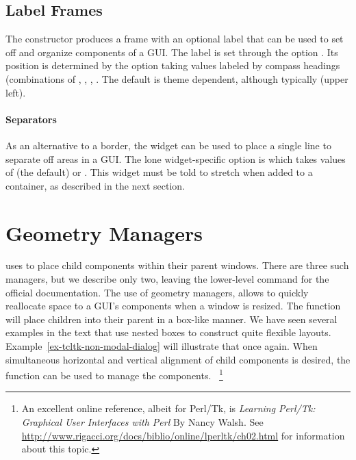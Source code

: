\subsection{Label Frames}
\label{sec:tcltk:label-frames}

The  constructor produces a frame with an
optional label that can be used to set off and organize components of
a GUI. The label is set through the option
. Its position is determined by the option
 taking values labeled by compass
headings (combinations of , , , . The
default is theme dependent, although typically  (upper
left).

\paragraph{Separators}
As an alternative to a border, the  widget can be used
to place a single line to separate off areas in a GUI. The lone
widget-specific option is  which takes
values of  (the default) or . This
widget must be told to stretch when added to a container, as described
in the next section.

\section{Geometry Managers}
\label{sec:tcltk:geometry-managers}

\TCL\/ uses  to place child
components within their parent windows. There are three such managers,
but we describe only two, leaving the lower-level  command
for the official documentation. The use of geometry managers, allows
\TK\/ to quickly reallocate space to a GUI's components when a window
is resized.  The  function will place children into
their parent in a box-like manner. We have seen several examples in
the text that use nested boxes to construct quite flexible layouts.
Example~\ref{ex-tcltk-non-modal-dialog} will illustrate that once
again. When simultaneous horizontal and vertical alignment of child
components is desired, the  function can be used to
manage the components. ~\footnote{An excellent online reference,
  albeit for Perl/Tk, is \textit{Learning Perl/Tk: Graphical User
    Interfaces with Perl} By Nancy Walsh. See
  \url{http://www.rigacci.org/docs/biblio/online/lperltk/ch02.html}
  for information about this topic.}
\\

